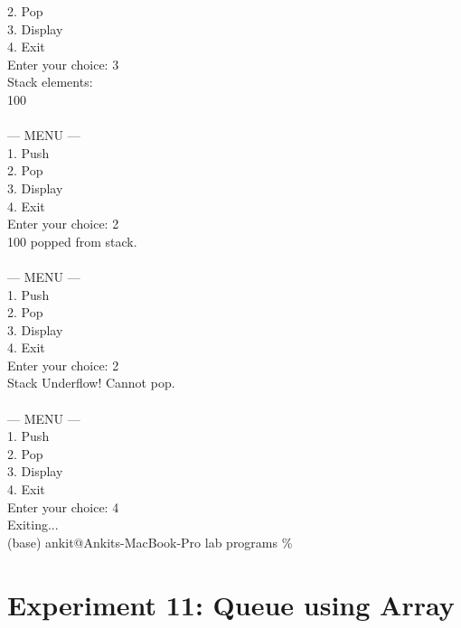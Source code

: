 \documentclass[12pt,a4paper]{article}
\begin{document}
\begin{tcolorbox}[terminalstyle, title=Sample Output]
{2. Pop\\
3. Display\\
4. Exit\\
Enter your choice: 3\\
Stack elements:\\
100\\
\\
--- MENU ---\\
1. Push\\
2. Pop\\
3. Display\\
4. Exit\\
Enter your choice: 2\\
100 popped from stack.\\
\\
--- MENU ---\\
1. Push\\
2. Pop\\
3. Display\\
4. Exit\\
Enter your choice: 2\\
Stack Underflow! Cannot pop.\\
\\
--- MENU ---\\
1. Push\\
2. Pop\\
3. Display\\
4. Exit\\
Enter your choice: 4\\
Exiting...\\
(base) ankit@Ankits-MacBook-Pro lab programs \%
}
\end{tcolorbox}


\newpage
\section*{Experiment 11: Queue using Array}
\end{document}
